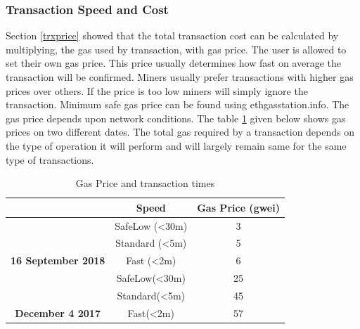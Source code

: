 \subsubsection{Transaction Speed and Cost} \label{TrxCost} 
Section \ref{trxprice} showed that the total transaction cost can be calculated by multiplying, the gas used by transaction, with gas price. The user is allowed to set their own gas price. This price usually determines how fast on average the transaction will be confirmed. Miners usually prefer transactions with higher gas prices over others. If the price is too low miners will simply ignore the transaction. Minimum safe gas price can be found using ethgasstation.info. The gas price depends upon network conditions. The table \ref{table:t2} given below shows gas prices on two different dates. The total gas required by a transaction depends on the type of operation it will perform and will largely remain same for the same type of transactions.
\begin{table}[h]
\begin{tabular}{|c|c|c|}
\hline
\rowcolor[HTML]{5B82BA} 
\multicolumn{1}{|l|}{\cellcolor[HTML]{5B82BA}{\color[HTML]{FFFFFF} \textbf{Date}}} & {\color[HTML]{EFEFEF} \textbf{Speed}} & {\color[HTML]{EFEFEF} \textbf{Gas Price (gwei)}} \\ \hline
                                                                                   & SafeLow (\textless{}30m)              & 3                                                \\ \cline{2-3} 
                                                                                   & Standard (\textless{}5m)              & 5                                                \\ \cline{2-3} 
\multirow{-3}{*}{\textbf{16 September 2018}}                                       & Fast (\textless{}2m)                  & 6                                                \\ \hline
                                                                                   & SafeLow(\textless{}30m)               & 25                                               \\ \cline{2-3} 
                                                                                   & Standard(\textless{}5m)               & 45                                               \\ \cline{2-3} 
\multirow{-3}{*}{\textbf{December 4 2017}}                                         & Fast(\textless{}2m)                   & 57                                               \\ \hline
\end{tabular}
\caption {Gas Price and transaction times}
\label{table:t2}
\end{table}


